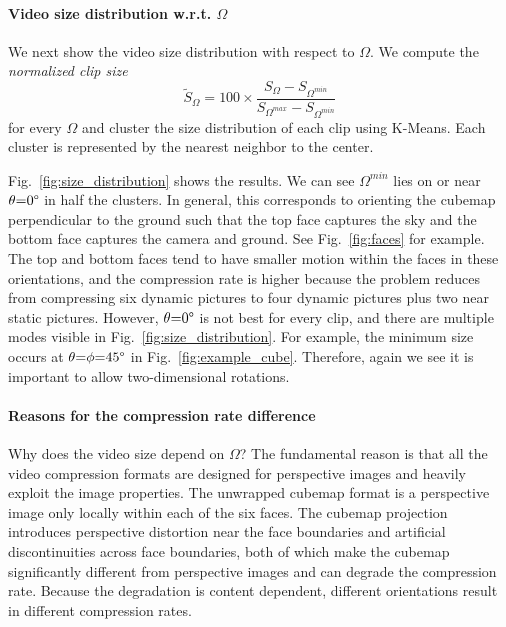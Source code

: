 \documentclass[journal,transmag]{IEEEtran}
\begin{document}
\paragraph{Video size distribution w.r.t. $\Omega$}

We next show the video size distribution with respect to $\Omega$.
We compute the \emph{normalized clip size}\begin{equation}
    \tilde{S}_{\Omega} = 100 \times \frac{S_{\Omega} - S_{\Omega^{min}}}{S_{\Omega^{max}}-S_{\Omega^{min}}}
    \label{eq:normalized_size}
\end{equation}
for every $\Omega$ and cluster the size distribution of each clip using K-Means.
Each cluster is represented by the nearest neighbor to the center.

Fig.~\ref{fig:size_distribution} shows the results.
We can see $\Omega^{min}$ lies on or near $\theta{=}0\degree$ in half the clusters.
In general, this corresponds to orienting the cubemap perpendicular to the ground such that the top face captures the sky and the bottom face captures the camera and ground.
See Fig.~\ref{fig:faces} for example.
The top and bottom faces tend to have smaller motion within the faces in these orientations,
and the compression rate is higher because the problem reduces from compressing six dynamic pictures to four dynamic pictures plus two near static pictures.  
However, $\theta{=}0\degree$ is not best for every clip, and there are multiple modes visible in Fig.~\ref{fig:size_distribution}.
For example, the minimum size occurs at $\theta{=}\phi{=}45\degree$ in Fig.~\ref{fig:example_cube}.
Therefore, again we see it is important to allow two-dimensional rotations.

\paragraph{Reasons for the compression rate difference}

Why does the video size depend on $\Omega$?  
The fundamental reason is that all the video compression formats are designed for perspective images and heavily exploit the image properties.
The unwrapped cubemap format is a perspective image only locally within each of the six faces.
The cubemap projection introduces perspective distortion near the face boundaries and artificial discontinuities across face boundaries,
both of which make the cubemap significantly different from perspective images and can degrade the compression rate.
Because the degradation is content dependent,
different orientations result in different compression rates.
\end{document}
